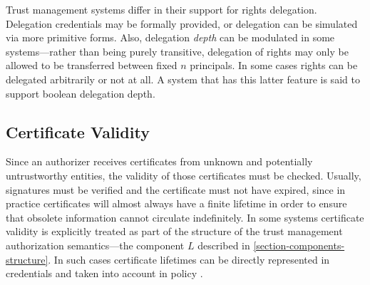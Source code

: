 Trust management systems differ in their support for rights delegation. Delegation credentials
may be formally provided, or delegation can be simulated via more primitive forms. Also,
delegation \emph{depth} can be modulated in some systems---rather than being purely transitive,
delegation of rights may only be allowed to be transferred between fixed $n$ principals. In some
cases rights can be delegated arbitrarily or not at all. A system that has this latter feature
is said to support boolean delegation depth.

%
%

\subsection{Certificate Validity}

Since an authorizer receives certificates from unknown and potentially untrustworthy entities,
the validity of those certificates must be checked. Usually, signatures must be verified and the
certificate must not have expired, since in practice certificates will almost always have a
finite lifetime in order to ensure that obsolete information cannot circulate indefinitely. In
some systems certificate validity is explicitly treated as part of the structure of the trust
management authorization semantics---the component $L$ described in
\autoref{section-components-structure}. In such cases certificate lifetimes can be directly
represented in credentials and taken into account in policy
\cite{Bauer:GFACSW,lbi-fc01,skalka-wang-chapin-jcs06}.

